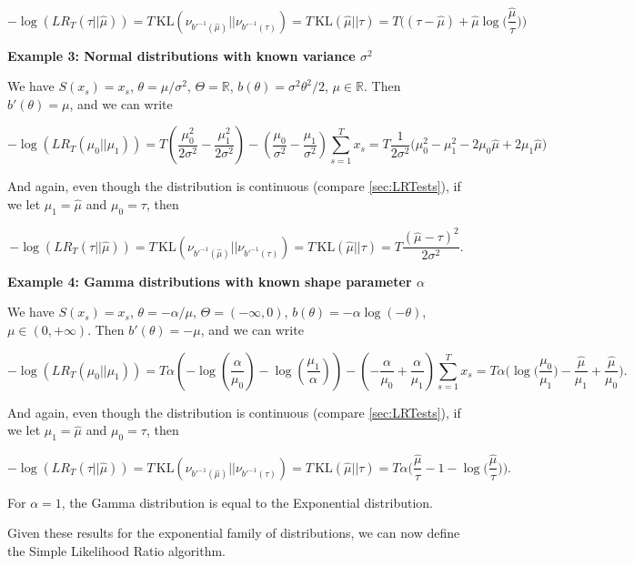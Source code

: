 \documentclass[11pt,]{article}
\newcommand{\KL}{\,\text{KL}}
\begin{document}
\[
-\log(LR_T(\tau||\hat{\mu})) = T \KL(\nu_{b'^{-1}(\hat{\mu})}||\nu_{b'^{-1}(\tau)}) = T \KL(\hat{\mu}||\tau) = T\Big((\tau - \hat{\mu}) + \hat{\mu}\log\Big(\frac{\hat{\mu}}{\tau}\Big)\Big)
\]

\textbf{Example 3: Normal distributions with known variance
\(\sigma^2\)}

We have \(S(x_s) = x_s\), \(\theta = \mu/\sigma^2\),
\(\Theta = \mathbb{R}\), \(b(\theta) = \sigma^2\theta^2/2\),
\(\mu \in \mathbb{R}\). Then \(b'(\theta) = \mu\), and we can write

\[
-\log(LR_T(\mu_0||\mu_1)) = T (\frac{\mu_0^2}{2\sigma^2} - \frac{\mu_1^2}{2\sigma^2}) - (\frac{\mu_0}{\sigma^2} - \frac{\mu_1}{\sigma^2})\sum_{s=1}^Tx_s = T\frac{1}{2\sigma^2}\Big(\mu_0^2-\mu_1^2 - 2\mu_0\hat{\mu} + 2\mu_1\hat{\mu}\Big)
\]

And again, even though the distribution is continuous (compare
\autoref{sec:LRTests}), if we let \(\mu_1 = \hat{\mu}\) and
\(\mu_0 = \tau\), then

\[
-\log(LR_T(\tau||\hat{\mu})) = T\KL(\nu_{b'^{-1}(\hat{\mu})}||\nu_{b'^{-1}(\tau)}) = T \KL(\hat{\mu}||\tau) = T\frac{(\hat{\mu} - \tau)^2}{2\sigma^2}.
\]

\textbf{Example 4: Gamma distributions with known shape parameter
\(\alpha\)}

We have \(S(x_s) = x_s\), \(\theta = -\alpha/\mu\),
\(\Theta = (-\infty, 0)\), \(b(\theta) = -\alpha \log(-\theta)\),
\(\mu \in (0,+\infty)\). Then \(b'(\theta) = -\mu\), and we can write

\[
-\log(LR_T(\mu_0||\mu_1)) = T\alpha(-\log(\frac{\alpha}{\mu_0}) - \log(\frac{\mu_1}{\alpha})) - (-\frac{\alpha}{\mu_0} + \frac{\alpha}{\mu_1})\sum_{s=1}^{T}x_s = T\alpha \Big(\log\big(\frac{\mu_0}{\mu_1}\big) - \frac{\hat{\mu}}{\mu_1} + \frac{\hat{\mu}}{\mu_0}\Big).
\]

And again, even though the distribution is continuous (compare
\autoref{sec:LRTests}), if we let \(\mu_1 = \hat{\mu}\) and
\(\mu_0 = \tau\), then

\[
-\log(LR_T(\tau||\hat{\mu})) = T \KL(\nu_{b'^{-1}(\hat{\mu})}||\nu_{b'^{-1}(\tau)}) = T \KL(\hat{\mu}||\tau) = T\alpha \Big(\frac{\hat{\mu}}{\tau} - 1 - \log\big(\frac{\hat{\mu}}{\tau}\big)\Big).
\]

For \(\alpha = 1\), the Gamma distribution is equal to the Exponential
distribution.

Given these results for the exponential family of distributions, we can
now define the Simple Likelihood Ratio algorithm.
\end{document}
